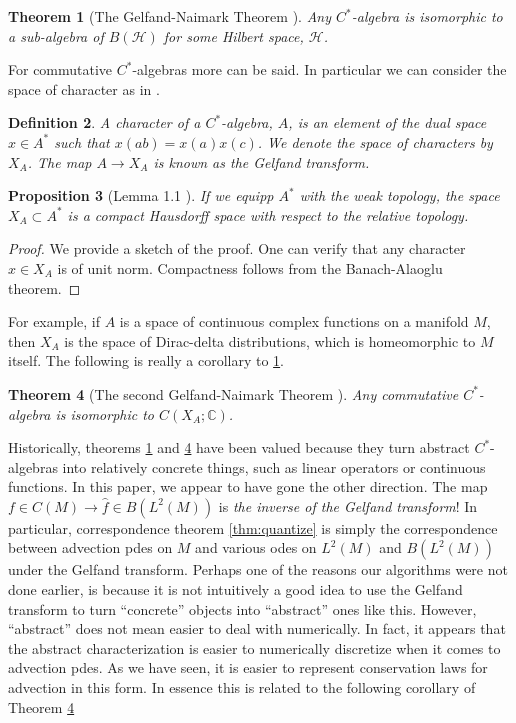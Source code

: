 \documentclass[12pt]{amsart}
\newtheorem{thm}{Theorem}[section]
\newtheorem{prop}[thm]{Proposition}
\newtheorem{defn}[thm]{Definition}
\begin{document}
\begin{thm}[The Gelfand-Naimark Theorem \cite{GelfandNaimark1943}] \label{thm:GN1}
	Any $C^{*}$-algebra is isomorphic to a sub-algebra of $B(\mathcal{H})$ for some Hilbert space, $\mathcal{H}$.
\end{thm}

For commutative $C^{*}$-algebras more can be said.
In particular we can consider the space of character as in \cite{Bondia2001}.

\begin{defn}
	A \emph{character} of a $C^{*}$-algebra, $A$, is an element of the dual space $x \in A^{*}$ such that
	$x(ab) = x(a) x(c)$.  We denote the space of characters by $X_{A}$.
	The map $A \to X_{A}$ is known as the \emph{Gelfand transform}.
\end{defn}

\begin{prop}[Lemma 1.1 \cite{Bondia2001}]
	If we equipp $A^{*}$ with the weak topology, the space $X_{A} \subset A^{*}$ is a compact Hausdorff space with respect to the relative topology.
\end{prop}
\begin{proof}
	We provide a sketch of the proof.
	One can verify that any character $x \in X_{A}$ is of unit norm.
	Compactness follows from the Banach-Alaoglu theorem.
\end{proof}

For example, if $A$ is a space of continuous complex functions on a manifold $M$, then $X_{A}$ is the space of Dirac-delta distributions, which is homeomorphic to $M$ itself.
The following is really a corollary to \ref{thm:GN1}.

\begin{thm}[The second Gelfand-Naimark Theorem \cite{GelfandNaimark1943}] \label{thm:GN2}
	Any commutative $C^{*}$-algebra is isomorphic to $C(X_{A} ; \mathbb{C})$.
\end{thm}

Historically, theorems \ref{thm:GN1} and \ref{thm:GN2} have been valued because they turn abstract $C^{*}$-algebras into relatively concrete things, such as linear operators or continuous functions.
In this paper, we appear to have gone the other direction.
The map $f \in C(M) \to \hat{f} \in B( L^{2}(M) )$ is \emph{the inverse of the Gelfand transform}!
In particular, correspondence theorem \ref{thm:quantize} is simply the correspondence between advection pdes on $M$ and various odes on $L^{2}(M)$ and $B(L^{2}(M))$ under the Gelfand transform.
Perhaps one of the reasons our algorithms were not done earlier, is because it is not intuitively a good idea to use the Gelfand transform to turn ``concrete'' objects into ``abstract'' ones like this.
However, ``abstract'' does not mean easier to deal with numerically.
In fact, it appears that the abstract characterization is easier to numerically discretize when it comes to advection pdes.
As we have seen, it is easier to represent conservation laws for advection in this form.
In essence this is related to the following corollary of Theorem \ref{thm:GN2}
\end{document}
